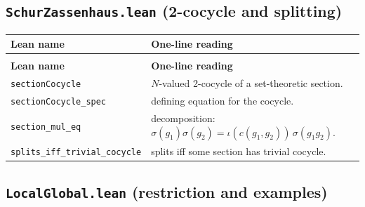 \documentclass[11pt]{article}
\begin{document}
\subsection*{\texttt{SchurZassenhaus.lean} (2-cocycle and splitting)}

{\footnotesize
\begin{longtable}{@{}>{\raggedright\arraybackslash}p{}>{\raggedright\arraybackslash}p{}@{}}
\toprule
\textbf{Lean name} & \textbf{One-line reading} \\
\midrule
\endfirsthead
\multicolumn{2}{c}{\textit{(continued)}} \\
\toprule
\textbf{Lean name} & \textbf{One-line reading} \\
\midrule
\endhead
\bottomrule
\endfoot

\texttt{sectionCocycle} & $N$-valued 2-cocycle of a set-theoretic section. \\
\texttt{sectionCocycle\_spec} & defining equation for the cocycle. \\
\texttt{section\_mul\_eq} & decomposition: $\sigma(g_1)\sigma(g_2) = \iota(c(g_1,g_2))\,\sigma(g_1 g_2)$. \\
\texttt{splits\_iff\_trivial\_cocycle} & splits iff some section has trivial cocycle. \\

\end{longtable}
}

\subsection*{\texttt{LocalGlobal.lean} (restriction and examples)}
\end{document}
